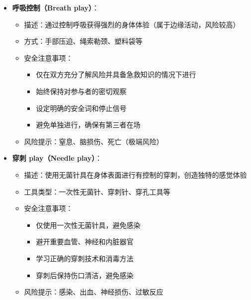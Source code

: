 \documentclass[12pt,UTF8]{ctexbook}
\begin{document}
\begin{itemize}
\begin{itemize}
      \begin{itemize}
      \item 测试物品的温度，避免烫伤或冻伤
      \item 选择专门的低温蜡烛（熔点在50-60℃）
      \item 避免将热蜡滴在敏感部位（如眼睛、黏膜、乳头）
      \item 不要将冰块直接放在皮肤上过长时间
      \end{itemize}
    \item 风险提示：烫伤、冻伤、皮肤过敏
    \end{itemize}
  \item \textbf{呼吸控制（Breath play）}：
    \begin{itemize}
    \item 描述：通过控制呼吸获得强烈的身体体验（属于边缘活动，风险较高）
    \item 方式：手部压迫、绳索勒颈、塑料袋等
    \item 安全注意事项：
      \begin{itemize}
      \item 仅在双方充分了解风险并具备急救知识的情况下进行
      \item 始终保持对参与者的密切观察
      \item 设定明确的安全词和停止信号
      \item 避免单独进行，确保有第三者在场
      \end{itemize}
    \item 风险提示：窒息、脑损伤、死亡（极端风险）
    \end{itemize}
  \item \textbf{穿刺 play（Needle play）}：
    \begin{itemize}
    \item 描述：使用无菌针具在身体表面进行有控制的穿刺，创造独特的感觉体验
    \item 工具类型：一次性无菌针、穿刺针、穿孔工具等
    \item 安全注意事项：
      \begin{itemize}
      \item 仅使用一次性无菌针具，避免感染
      \item 避开重要血管、神经和内脏器官
      \item 学习正确的穿刺技术和消毒方法
      \item 穿刺后保持伤口清洁，避免感染
      \end{itemize}
    \item 风险提示：感染、出血、神经损伤、过敏反应
    \end{itemize}

\end{itemize}
\end{document}
